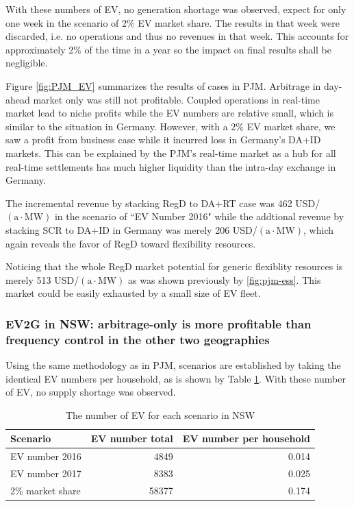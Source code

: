 With these numbers of EV, no generation shortage was observed, expect for only one week in the scenario of 2\% EV market share. The results in that week were discarded, i.e. no operations and thus no revenues in that week. This accounts for approximately 2\% of the time in a year so the impact on final results shall be negligible.

Figure \ref{fig:PJM_EV} summarizes the results of cases in PJM. Arbitrage in day-ahead market only was still not profitable. Coupled operations in real-time market lead to niche profits while the EV numbers are relative small, which is similar to the situation in Germany. However, with a 2\% EV market share, we saw a profit from business case while it incurred loss in Germany's DA+ID markets. This can be explained by the PJM's real-time market as a hub for all real-time settlements has much higher liquidity than the intra-day exchange in Germany.

The incremental revenue by stacking RegD to DA+RT case was 462 USD/$(\text{a} \cdot \text{MW})$ in the scenario of ``EV Number 2016" while the addtional revenue by stacking SCR to DA+ID in Germany was merely 206 USD/$(\text{a} \cdot \text{MW})$, which again reveals the favor of RegD toward flexibility resources. 

Noticing that the whole RegD market potential for generic flexiblity resources is merely 513 USD/$(\text{a} \cdot \text{MW})$ as was shown previously by \ref{fig:pjm-ess}. This market could be easily exhausted by a small size of EV fleet. 
 
\subsubsection{EV2G in NSW: arbitrage-only is more profitable than frequency control in the other two geographies}

Using the same methodology as in PJM, scenarios are established by taking the identical EV numbers per household, as is shown by Table \ref{tab:ev-number-scenario-nsw}. With these number of EV, no supply shortage was observed.  

\begin{table}[h!]
	\centering
	\begin{tabular}{ l r r }
		\hline
		\textbf{Scenario} & \textbf{EV number total} & \textbf{EV number per household} \\
		\hline
		EV number 2016 &  \num{4849} & \num{0.014} \\
		EV number 2017 &  \num{8383} & \num{0.025} \\
		2\% market share &  \num{58377} & \num{0.174} \\
		\hline
	\end{tabular}
	\caption{The number of EV for each scenario in NSW}\label{tab:ev-number-scenario-nsw}
\end{table}


